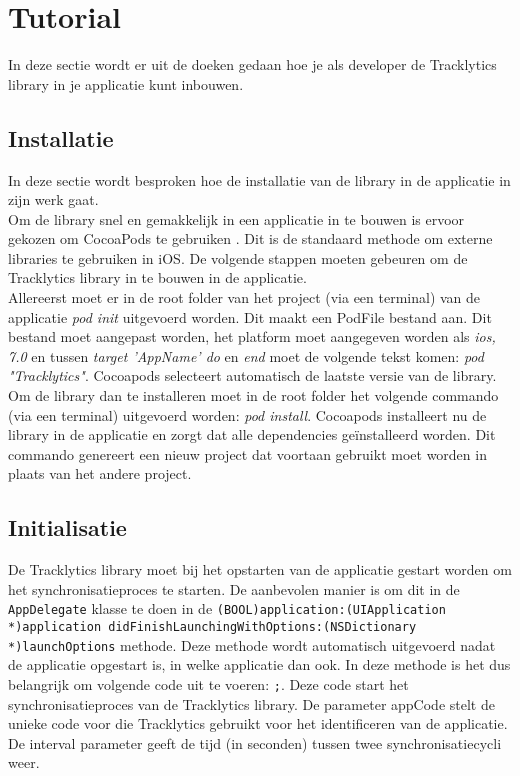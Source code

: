\chapter{Tutorial}\label{documentatie}
In deze sectie wordt er uit de doeken gedaan hoe je als developer de Tracklytics library in je applicatie kunt inbouwen. 

\section{Installatie}
In deze sectie wordt besproken hoe de installatie van de library in de applicatie in zijn werk gaat. \\

Om de library snel en gemakkelijk in een applicatie in te bouwen is ervoor gekozen om CocoaPods te gebruiken \cite{CocoaPods}. Dit is de standaard methode om externe libraries te gebruiken in iOS. De volgende stappen moeten gebeuren om de Tracklytics library in te bouwen in de applicatie. \\

\noindent Allereerst moet er in de root folder van het project (via een terminal) van de applicatie \textit{pod init} uitgevoerd worden. Dit maakt een PodFile bestand aan. Dit bestand moet aangepast worden, het platform moet aangegeven worden als \textit{ios, 7.0} en tussen \textit{target 'AppName' do} en \textit{end} moet de volgende tekst komen: \textit{pod "Tracklytics"}. Cocoapods selecteert automatisch de laatste versie van de library. \\

\noindent Om de library dan te installeren moet in de root folder het volgende commando (via een terminal) uitgevoerd worden: \textit{pod install}. Cocoapods installeert nu de library in de applicatie en zorgt dat alle dependencies geïnstalleerd worden. Dit commando genereert een nieuw project dat voortaan gebruikt moet worden in plaats van het andere project.



\section{Initialisatie}
De Tracklytics library moet bij het opstarten van de applicatie gestart worden om het synchronisatieproces te starten. De aanbevolen manier is om dit in de \texttt{\justify AppDelegate} klasse te doen in de \texttt{\justify (BOOL)application:(UIApplication *)application didFinishLaunchingWithOptions:(NSDictionary *)launchOptions} methode. Deze methode wordt automatisch uitgevoerd nadat de applicatie opgestart is, in welke applicatie dan ook. In deze methode is het dus belangrijk om volgende code uit te voeren: \texttt{;}. Deze code start het synchronisatieproces van de Tracklytics library. De parameter appCode stelt de unieke code voor die Tracklytics gebruikt voor het identificeren van de applicatie. De interval parameter geeft de tijd (in seconden) tussen twee synchronisatiecycli weer. 

